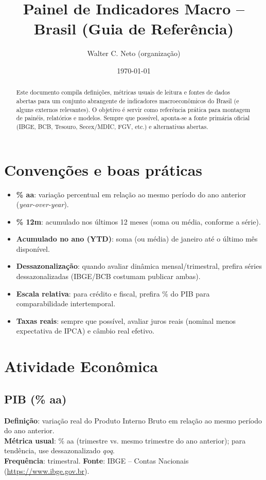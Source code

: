 \documentclass[11pt,a4paper]{article}
\title{Painel de Indicadores Macro -- Brasil (Guia de Referência)}
\author{Walter C. Neto (organização) }
\date{\today}
\begin{document}
\maketitle

\begin{abstract}
Este documento compila definições, métricas usuais de leitura e fontes de dados abertas para um conjunto abrangente de indicadores macroeconômicos do Brasil (e alguns externos relevantes). O objetivo é servir como referência prática para montagem de painéis, relatórios e modelos. Sempre que possível, aponta-se a fonte primária oficial (IBGE, BCB, Tesouro, Secex/MDIC, FGV, etc.) e alternativas abertas.
\end{abstract}

\section{Convenções e boas práticas}
\begin{itemize}
  \item \textbf{\% aa}: variação percentual em relação ao mesmo período do ano anterior (\emph{year-over-year}).
  \item \textbf{\% 12m}: acumulado nos últimos 12 meses (soma ou média, conforme a série).
  \item \textbf{Acumulado no ano (YTD)}: soma (ou média) de janeiro até o último mês disponível.
  \item \textbf{Dessazonalização}: quando avaliar dinâmica mensal/trimestral, prefira séries dessazonalizadas (IBGE/BCB costumam publicar ambas).
  \item \textbf{Escala relativa}: para crédito e fiscal, prefira \% do PIB para comparabilidade intertemporal.
  \item \textbf{Taxas reais}: sempre que possível, avaliar juros reais (nominal menos expectativa de IPCA) e câmbio real efetivo.
\end{itemize}

\section{Atividade Econômica}
\subsection*{PIB (\% aa)}
\textbf{Definição}: variação real do Produto Interno Bruto em relação ao mesmo período do ano anterior.\\
\textbf{Métrica usual}: \% aa (trimestre vs. mesmo trimestre do ano anterior); para tendência, use dessazonalizado \emph{qoq}.\\
\textbf{Frequência}: trimestral. \textbf{Fonte}: IBGE -- Contas Nacionais (\url{https://www.ibge.gov.br}).
\end{document}
